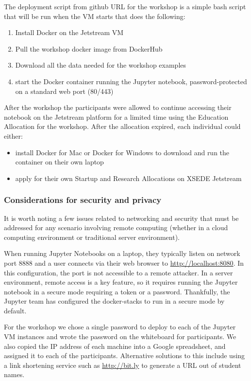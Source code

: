 The deployment script from github URL for the workshop is a simple bash script
that will be run when the VM starts that does the following:

\begin{enumerate}
\item Install Docker on the Jetstream VM
\item Pull the workshop docker image from DockerHub
\item Download all the data needed for the workshop examples
\item start the Docker container running the Jupyter notebook, password-protected on a standard web port (80/443)
\end{enumerate}

After the workshop the participants were allowed to continue accessing their
notebook on the Jetstream platform for a limited time using the Education
Allocation for the workshop. After the allocation expired, each individual could
either:

\begin{itemize}

\item install Docker for Mac or Docker for Windows to download and run the
      container on their own laptop
\item apply for their own Startup and Research Allocations on XSEDE Jetstream

\end{itemize}

\subsubsection{Considerations for security and privacy}

It is worth noting a few issues related to networking and security that must be
addressed for any scenario involving remote computing (whether in a cloud
computing environment or traditional server environment).

When running Jupyter Notebooks on a laptop, they typically listen on network
port 8888 and a user connects via their web browser to
\url{http://localhost:8080}. In this configuration, the port is not accessible
to a remote attacker. In a server environment, remote access is a key
feature, so it requires running the Jupyter notebook in a secure mode requiring
a token or a password. Thankfully, the Jupyter team has configured the
docker-stacks to run in a secure mode by default.

For the workshop we chose a single password to deploy to each of the Jupyter VM
instances and wrote the password on the whiteboard for participants. We also
copied the IP address of each machine into a Google spreadsheet, and assigned it
to each of the participants. Alternative solutions to this include using a link
shortening service such as \url{http://bit.ly} to generate a URL out of student
names.
